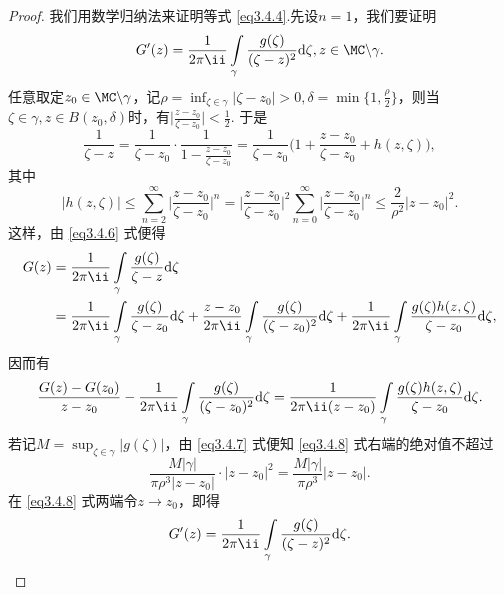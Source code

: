 \begin{proof}
我们用数学归纳法来证明等式 \eqref{eq3.4.4}.先设$n=1$，我们要证明
\begin{equation}\label{eq3.4.5}
G'(z)=\frac1{2\pi\ii}\int\limits_\gamma \frac{g(\zeta)}{(\zeta-z)^2}\textrm d\zeta,z\in\MC\backslash\gamma.
\end{equation}
任意取定$z_0\in\MC\backslash\gamma$，记$\rho=\inf_{\zeta\in\gamma}|\zeta-z_0|>0,\delta=\min\bigg\{1,\frac\rho2\bigg\}$，则当$\zeta\in\gamma,z\in B(z_0,\delta)$时，有$\bigg|\frac{z-z_0}{\zeta-z_0}\bigg|<\frac12$. 于是
\begin{equation}\label{eq3.4.6}
\frac1{\zeta-z}=\frac1{\zeta-z_0}\cdot\frac1{1-\frac{z-z_0}{\zeta-z_0}}
=\frac1{\zeta-z_0}\bigg(1+\frac{z-z_0}{\zeta-z_0}+h(z,\zeta)\bigg),
\end{equation}
其中
\begin{equation}\label{eq3.4.7}
|h(z,\zeta)|\le\sum_{n=2}^\infty\bigg|\frac{z-z_0}{\zeta-z_0}\bigg|^n
=\bigg|\frac{z-z_0}{\zeta-z_0}\bigg|^2\sum_{n=0}^\infty \bigg|\frac{z-z_0}{\zeta-z_0}\bigg|^n
\le\frac2{\rho^2}|z-z_0|^2.
\end{equation}
这样，由 \eqref{eq3.4.6} 式便得
\begin{align*}
G(z)&=\frac1{2\pi\ii}\int\limits_\gamma\frac{g(\zeta)}{\zeta-z}\textrm d\zeta\\
&=\frac1{2\pi\ii}\int\limits_\gamma\frac{g(\zeta)}{\zeta-z_0}\textrm d\zeta+\frac{z-z_0}{2\pi\ii}\int\limits_\gamma\frac{g(\zeta)}{(\zeta-z_0)^2}\textrm d\zeta
+\frac1{2\pi\ii}\int\limits_\gamma\frac{g(\zeta)h(z,\zeta)}{\zeta-z_0}\textrm d\zeta,
\end{align*}
因而有
\begin{equation}\label{eq3.4.8}
\frac{G(z)-G(z_0)}{z-z_0}-\frac1{2\pi\ii}\int\limits_\gamma\frac{g(\zeta)}{(\zeta-z_0)^2}\textrm d\zeta=\frac1{2\pi\ii(z-z_0)}\int\limits_\gamma\frac{g(\zeta)h(z,\zeta)}{\zeta-z_0}\textrm d\zeta.
\end{equation}
若记$M=\sup_{\zeta\in\gamma}|g(\zeta)|$，由 \eqref{eq3.4.7} 式便知 \eqref{eq3.4.8} 式右端的绝对值不超过
\[\frac{M|\gamma|}{\pi\rho^3|z-z_0|}\cdot|z-z_0|^2=\frac{M|\gamma|}{\pi\rho^3}|z-z_0|.\]
在 \eqref{eq3.4.8} 式两端令$z\to z_0$，即得
\[G'(z)=\frac1{2\pi\ii}\int\limits_\gamma\frac{g(\zeta)}{(\zeta-z)^2}\textrm d\zeta.\]


\end{proof}
